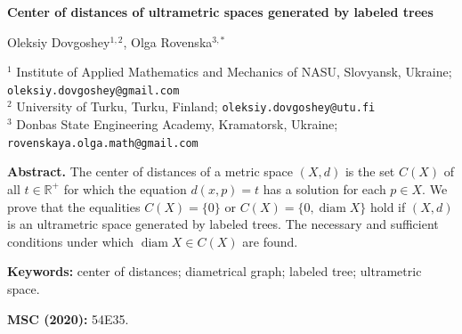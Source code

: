\documentclass{article}
\begin{document}
\newtheorem{Theorem}{Theorem}
\newtheorem{Lemma}{Lemma}
\newtheorem{Proposition}{Proposition}
\newtheorem{Corollary}{Corollary}
\newtheorem{Definition}{Definition}
\newtheorem{Example}{Example}
\newtheorem{Remark}{Remark}
\newtheorem{Conjecture}{Conjecture}







\begin{center}
{\large\bfseries Center of distances of ultrametric spaces generated by labeled trees}

\vspace{10pt}

Oleksiy Dovgoshey$^{1,2}$, Olga Rovenska$^{3,*}$

\vspace{6pt}

{\small
$^{1}$ Institute of Applied Mathematics and Mechanics of NASU, Slovyansk, Ukraine;  
\texttt{oleksiy.dovgoshey@gmail.com}\\
$^{2}$ University of Turku, Turku, Finland;  
\texttt{oleksiy.dovgoshey@utu.fi}\\
$^{3}$ Donbas State Engineering Academy, Kramatorsk, Ukraine;  
\texttt{rovenskaya.olga.math@gmail.com}
}

\end{center}

\vspace{10pt}

\noindent\textbf{Abstract.}  
 The center of distances of a metric space $(X,d)$ is the set
\(
C(X)\) of all $t\in \mathbb R^+$ for which the equation $d(x,p)=t$ has a solution for each $p\in X$.
We prove that the equalities $C(X)=\{0\}$ or
\(
C(X)=\{0,\operatorname{diam}X\}
\)
hold if $(X,d)$ is an ultrametric space generated by labeled trees.
The necessary and sufficient conditions under which $\operatorname{diam} X\in C(X)$ are found.







\vspace{8pt}

\noindent\textbf{Keywords:}  
center of distances; diametrical graph; labeled tree; ultrametric space.

\vspace{8pt}

\noindent\textbf{MSC (2020):} 54E35.
\end{document}
